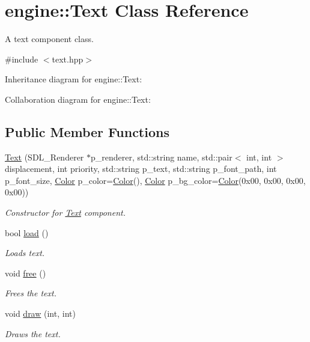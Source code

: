 \hypertarget{classengine_1_1_text}{}\section{engine\+:\+:Text Class Reference}
\label{classengine_1_1_text}


A text component class.  




{\ttfamily \#include $<$text.\+hpp$>$}



Inheritance diagram for engine\+:\+:Text\+:


Collaboration diagram for engine\+:\+:Text\+:
\subsection*{Public Member Functions}
\begin{DoxyCompactItemize}
\item 
\hyperlink{classengine_1_1_text_a425360c835a5b98475a830d6d561e5ed}{Text} (S\+D\+L\+\_\+\+Renderer $\ast$p\+\_\+renderer, std\+::string name, std\+::pair$<$ int, int $>$ displacement, int priority, std\+::string p\+\_\+text, std\+::string p\+\_\+font\+\_\+path, int p\+\_\+font\+\_\+size, \hyperlink{structengine_1_1_color}{Color} p\+\_\+color=\hyperlink{structengine_1_1_color}{Color}(), \hyperlink{structengine_1_1_color}{Color} p\+\_\+bg\+\_\+color=\hyperlink{structengine_1_1_color}{Color}(0x00, 0x00, 0x00, 0x00))
\begin{DoxyCompactList}\small\item\em Constructor for \hyperlink{classengine_1_1_text}{Text} component. \end{DoxyCompactList}\item 
bool \hyperlink{classengine_1_1_text_a88ce89de3c78db0d163a7496261edc2d}{load} ()
\begin{DoxyCompactList}\small\item\em Loads text. \end{DoxyCompactList}\item 
void \hyperlink{classengine_1_1_text_af6e2ba3f1cf543997b12dcc5ad5041c2}{free} ()
\begin{DoxyCompactList}\small\item\em Frees the text. \end{DoxyCompactList}\item 
void \hyperlink{classengine_1_1_text_aab42d46b709807d21ba73a4c59c18408}{draw} (int, int)
\begin{DoxyCompactList}\small\item\em Draws the text. \end{DoxyCompactList}\end{DoxyCompactItemize}


